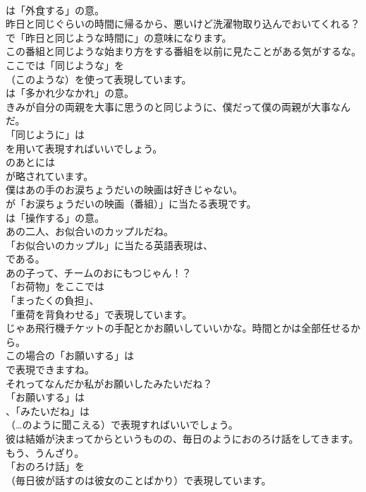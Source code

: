 \documentclass[8pt]{extreport}
\begin{document}
\begin{CJK}{UTF8}{min}
\\	は「外食する」の意。	
\\	昨日と同じぐらいの時間に帰るから、悪いけど洗濯物取り込んでおいてくれる？ 
\\	で「昨日と同じような時間に」の意味になります。	
\\	この番組と同じような始まり方をする番組を以前に見たことがある気がするな。 
\\	ここでは「同じような」を
\\	（このような）を使って表現しています。
\\	は「多かれ少なかれ」の意。	
\\	きみが自分の両親を大事に思うのと同じように、僕だって僕の両親が大事なんだ。 
\\	「同じように」は 
\\	を用いて表現すればいいでしょう。
\\	のあとには
\\	が略されています。	
\\	僕はあの手のお涙ちょうだいの映画は好きじゃない。 
\\	が「お涙ちょうだいの映画（番組）」に当たる表現です。
\\	は「操作する」の意。	
\\	あの二人、お似合いのカップルだね。 
\\	「お似合いのカップル」に当たる英語表現は、
\\	である。	
\\	あの子って、チームのおにもつじゃん！？ 
\\	「お荷物」をここでは
\\	「まったくの負担」、
\\	「重荷を背負わせる」で表現しています。	
\\	じゃあ飛行機チケットの手配とかお願いしていいかな。時間とかは全部任せるから。 
\\	この場合の「お願いする」は
\\	で表現できますね。	
\\	それってなんだか私がお願いしたみたいだね？ 
\\	「お願いする」は 
\\	、「みたいだね」は 
\\	（…のように聞こえる）で表現すればいいでしょう。	
\\	彼は結婚が決まってからというものの、毎日のようにおのろけ話をしてきます。もう、うんざり。 
\\	「おのろけ話」を 
\\	（毎日彼が話すのは彼女のことばかり）で表現しています。	

\end{CJK}
\end{document}
